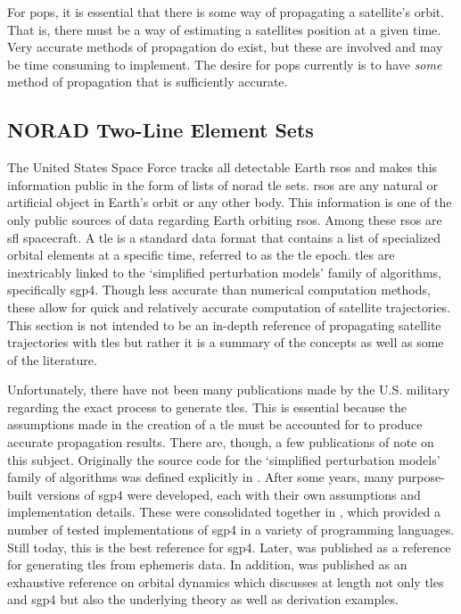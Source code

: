 For \gls{pops}, it is essential that there is some way of propagating a
satellite's orbit. That is, there must be a way of estimating a satellites
position at a given time.  Very accurate methods of propagation do exist, but
these are involved and may be time consuming to implement. The desire for
\gls{pops} currently is to have \textit{some} method of propagation that is
sufficiently accurate.

\subsection{NORAD Two-Line Element Sets}

The United States Space Force tracks all detectable Earth \glspl{rso} and makes
this information public in the form of lists of \gls{norad} \gls{tle} sets.
\glspl{rso} are any natural or artificial object in Earth's orbit or any other
body.  This information is one of the only public sources of data regarding
Earth orbiting \glspl{rso}. Among these \glspl{rso} are \gls{sfl} spacecraft. A
\gls{tle} is a standard data format that contains a list of specialized orbital
elements at a specific time, referred to as the \gls{tle} epoch. \glspl{tle}
are inextricably linked to the `simplified perturbation models' family of
algorithms, specifically \gls{sgp4}.  Though less accurate than numerical
computation methods, these allow for quick and relatively accurate computation
of satellite trajectories.  This section is not intended to be an in-depth
reference of propagating satellite trajectories with \glspl{tle} but rather it
is a summary of the concepts as well as some of the literature.

Unfortunately, there have not been many publications made by the U.S. military
regarding the exact process to generate \glspl{tle}. This is essential because
the assumptions made in the creation of a \gls{tle} must be accounted for to
produce accurate propagation results. There are, though, a few publications of
note on this subject. Originally the source code for the `simplified
perturbation models' family of algorithms was defined explicitly in
\cite{hoots_spacetrack_1980}.  After some years, many purpose-built versions of
\gls{sgp4} were developed, each with their own assumptions and implementation
details. These were consolidated together in \cite{vallado_revisiting_2006},
which provided a number of tested implementations of \gls{sgp4} in a variety of
programming languages. Still today, this is the best reference for \gls{sgp4}.
Later, \cite{vallado_sgp4_2008} was published as a reference for generating
\glspl{tle} from ephemeris data. In addition, \cite{vallado_fundamentals_2001}
was published as an exhaustive reference on orbital dynamics which discusses at
length not only \glspl{tle} and \gls{sgp4} but also the underlying theory as
well as derivation examples.



